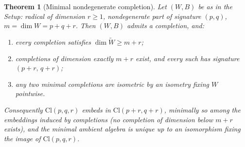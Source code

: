 \documentclass[11pt]{article}
\newtheorem{theorem}{Theorem}[section]
\theoremstyle{definition}
\theoremstyle{plain}
\providecommand{\Cl}{}\renewcommand{\Cl}{\mathrm{Cl}}
\begin{document}
\begin{theorem}[Minimal nondegenerate completion]\label{c:conformal.minimal-nondegenerate-completion}
Let $(W,B)$ be as in the Setup: radical of dimension $r \geq 1$, nondegenerate part of signature $(p,q)$, $m = \dim W = p + q + r$. Then $(W,B)$ admits a completion, and:
\begin{enumerate}
\item every completion satisfies $\dim \widetilde W \geq m + r$;
\item completions of dimension exactly $m + r$ exist, and every such has signature $(p{+}r,\, q{+}r)$;
\item any two minimal completions are isometric by an isometry fixing $W$ pointwise.
\end{enumerate}
Consequently $\Cl(p,q,r)$ embeds in $\Cl(p{+}r, q{+}r)$, minimally so among the embeddings induced by completions (no completion of dimension below $m + r$ exists), and the minimal ambient algebra is unique up to an isomorphism fixing the image of $\Cl(p,q,r)$.
\end{theorem}
\end{document}
